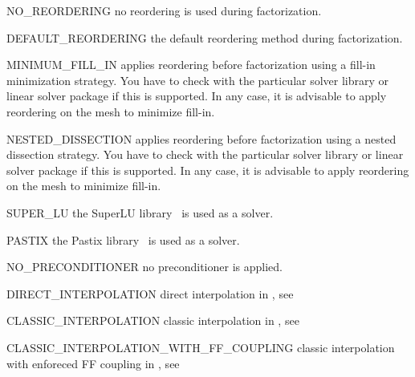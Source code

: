 \begin{memberdesc}[SolverOptions]{NO_REORDERING}
no reordering is used during factorization.
\end{memberdesc}

\begin{memberdesc}[SolverOptions]{DEFAULT_REORDERING}
the default reordering method during factorization.
\end{memberdesc}

\begin{memberdesc}[SolverOptions]{MINIMUM_FILL_IN}
applies reordering before factorization using a fill-in minimization strategy.
You have to check with the particular solver library or linear solver package
if this is supported. In any case, it is advisable to apply reordering on the
mesh to minimize fill-in.
\end{memberdesc}

\begin{memberdesc}[SolverOptions]{NESTED_DISSECTION}
applies reordering before factorization using a nested dissection strategy.
You have to check with the particular solver library or linear solver package
if this is supported. In any case, it is advisable to apply reordering on the
mesh to minimize fill-in.
\end{memberdesc}

\begin{memberdesc}[SolverOptions]{SUPER_LU}
the SuperLU library~\cite{SuperLU} is used as a solver.
\end{memberdesc}

\begin{memberdesc}[SolverOptions]{PASTIX}
the Pastix library~\cite{PASTIX} is used as a solver.
\end{memberdesc}

\begin{memberdesc}[SolverOptions]{NO_PRECONDITIONER}
no preconditioner is applied.
\end{memberdesc}

\begin{memberdesc}[SolverOptions]{DIRECT_INTERPOLATION}
direct interpolation in \AMG, see \cite{AMG}
\end{memberdesc}
\begin{memberdesc}[SolverOptions]{CLASSIC_INTERPOLATION}
classic interpolation in \AMG, see \cite{AMG}
\end{memberdesc}
\begin{memberdesc}[SolverOptions]{CLASSIC_INTERPOLATION_WITH_FF_COUPLING}
classic interpolation with enforeced FF coupling in \AMG, see \cite{AMG}
\end{memberdesc}


